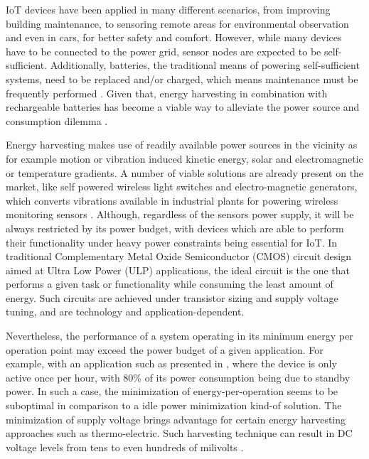 \documentclass[pgmicro,mestrado,english]{iiufrgs}
\begin{document}
    IoT devices have been applied in many different scenarios, from improving building maintenance, to sensoring remote areas for environmental observation and even in cars, for better safety and comfort. However, while many devices have to be connected to the power grid, sensor nodes are expected to be self-sufficient. Additionally, batteries, the traditional means of powering self-sufficient systems, need to be replaced and/or charged, which means maintenance must be frequently performed \cite{bleitner2018comparison}. Given that, energy harvesting in combination with rechargeable batteries has become a viable way to alleviate the power source and consumption dilemma \cite{manoli2010energy}.

    Energy harvesting makes use of readily available power sources in the vicinity as for example motion or vibration induced kinetic energy, solar and electromagnetic or temperature gradients. A number of viable solutions are already present on the market, like self powered wireless light switches and electro-magnetic generators, which converts vibrations available in industrial plants for powering wireless monitoring sensors \cite{manoli2010energy} \cite{bleitner2018comparison}. Although, regardless of the sensors power supply, it will be always restricted by its power budget, with devices which are able to perform their functionality under heavy power constraints being essential for IoT. In traditional Complementary Metal Oxide Semiconductor (CMOS) circuit design aimed at Ultra Low Power (ULP) applications, the ideal circuit is the one that performs a given task or functionality while consuming the least amount of energy. Such circuits are achieved under transistor sizing and supply voltage tuning, and are technology and application-dependent.

    Nevertheless, the performance of a system operating in its minimum energy per operation point may exceed the power budget of a given application. For example, with an application such as presented in \cite{fojtik2013millimeter}, where the device is only active once per hour, with 80\% of its power consumption being due to standby power. In such a case, the minimization of energy-per-operation seems to be suboptimal in comparison to a idle power minimization kind-of solution. The minimization of supply voltage brings advantage for certain energy harvesting approaches such as thermo-electric. Such harvesting technique can result in DC voltage levels from tens to even hundreds of milivolts \cite{khan2014flexible}.
\end{document}
